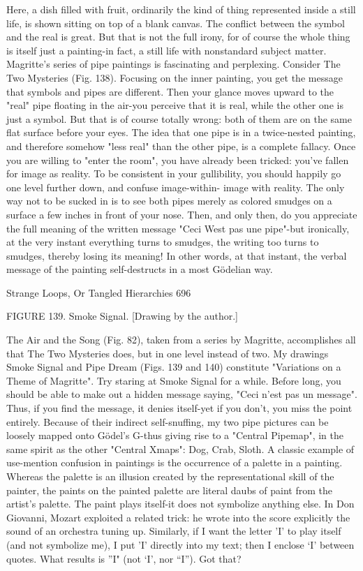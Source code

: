 Here, a dish filled with fruit, ordinarily the kind of thing represented inside a still life, is
shown sitting on top of a blank canvas. The conflict between the symbol and the real is
great. But that is not the full irony, for of course the whole thing is itself just a painting-in
fact, a still life with nonstandard subject matter.
         Magritte's series of pipe paintings is fascinating and perplexing. Consider The
Two Mysteries (Fig. 138). Focusing on the inner painting, you get the message that
symbols and pipes are different. Then your glance moves upward to the "real" pipe
floating in the air-you perceive that it is real, while the other one is just a symbol. But that
is of course totally wrong: both of them are on the same flat surface before your eyes.
The idea that one pipe is in a twice-nested painting, and therefore somehow "less real"
than the other pipe, is a complete fallacy. Once you are willing to "enter the room", you
have already been tricked: you've fallen for image as reality. To be consistent in your
gullibility, you should happily go one level further down, and confuse image-within-
image with reality. The only way not to be sucked in is to see both pipes merely as
colored smudges on a surface a few inches in front of your nose. Then, and only then, do
you appreciate the full meaning of the written message "Ceci West pas une pipe"-but
ironically, at the very instant everything turns to smudges, the writing too turns to
smudges, thereby losing its meaning! In other words, at that instant, the verbal message
of the painting self-destructs in a most Gödelian way.




Strange Loops, Or Tangled Hierarchies                                                       696

                  FIGURE 139. Smoke Signal. [Drawing by the author.]

         The Air and the Song (Fig. 82), taken from a series by Magritte, accomplishes all
that The Two Mysteries does, but in one level instead of two. My drawings Smoke Signal
and Pipe Dream (Figs. 139 and 140) constitute "Variations on a Theme of Magritte". Try
staring at Smoke Signal for a while. Before long, you should be able to make out a hidden
message saying, "Ceci n'est pas un message". Thus, if you find the message, it denies
itself-yet if you don't, you miss the point entirely. Because of their indirect self-snuffing,
my two pipe pictures can be loosely mapped onto Gödel’s G-thus giving rise to a
"Central Pipemap", in the same spirit as the other "Central Xmaps": Dog, Crab, Sloth.
         A classic example of use-mention confusion in paintings is the occurrence of a
palette in a painting. Whereas the palette is an illusion created by the representational
skill of the painter, the paints on the painted palette are literal daubs of paint from the
artist's palette. The paint plays itself-it does not symbolize anything else. In Don
Giovanni, Mozart exploited a related trick: he wrote into the score explicitly the sound of
an orchestra tuning up. Similarly, if I want the letter 'I' to play itself (and not symbolize
me), I put 'I' directly into my text; then I enclose `I' between quotes. What results is ''I"
(not `I', nor "`I"'). Got that?




